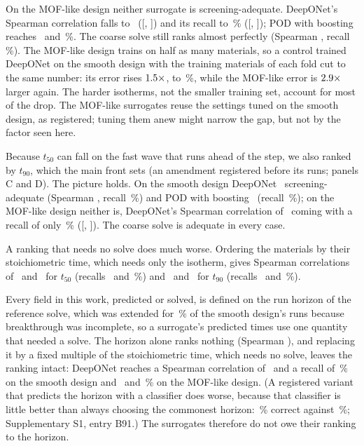 \documentclass[10pt,a4paper]{article}
\begin{document}
On the MOF-like design neither surrogate is screening-adequate. DeepONet's Spearman
correlation falls to \nScrVthreeDonSp\ ([\nScrVthreeDonSpLo, \nScrVthreeDonSpHi]) and its
recall to \nScrVthreeDonRc\,\% ([\nScrVthreeDonRcLo, \nScrVthreeDonRcHi]); POD with boosting
reaches \nScrVthreeHgbSp\ and \nScrVthreeHgbRc\,\%. The coarse solve still ranks almost
perfectly (Spearman \nScrVthreeCoSp, recall \nScrVthreeCoRc\,\%). The MOF-like design trains
on half as many materials, so a control trained DeepONet on the smooth design with the
training materials of each fold cut to the same number: its error rises
\(1.5\times\), to \nCtlNr\,\%, while the MOF-like error is \(2.9\times\)
larger again. The harder isotherms, not the smaller training set, account for most of the
drop. The MOF-like surrogates reuse the settings tuned on the smooth design, as registered;
tuning them anew might narrow the gap, but not by the factor seen here.

Because \(t_{50}\) can fall on the fast wave that runs ahead of the step, we also ranked by
\(t_{90}\), which the main front sets (an amendment registered before its runs; panels C and
D). The picture holds. On the smooth design DeepONet \nSnVtwoNinetyDonOk\ screening-adequate
(Spearman \nSnVtwoNinetyDonSp, recall \nSnVtwoNinetyDonRc\,\%) and POD with boosting
\nSnVtwoNinetyHgbOk\ (recall \nSnVtwoNinetyHgbRc\,\%); on the MOF-like design neither is,
DeepONet's Spearman correlation of \nSnVthreeNinetyDonSp\ coming with a recall of only
\nSnVthreeNinetyDonRc\,\% ([\nSnVthreeNinetyDonRcLo, \nSnVthreeNinetyDonRcHi]). The coarse solve
is adequate in every case.

A ranking that needs no solve does much worse. Ordering the materials by their
stoichiometric time, which needs only the isotherm, gives Spearman correlations of
\nBaseVtwoSp\ and \nBaseVthreeSp\ for \(t_{50}\) (recalls \nBaseVtwoRc\ and \nBaseVthreeRc\,\%)
and \nSnBaseVtwoNinetySp\ and \nSnBaseVthreeNinetySp\ for \(t_{90}\) (recalls
\nSnBaseVtwoNinetyRc\ and \nSnBaseVthreeNinetyRc\,\%).

Every field in this work, predicted or solved, is defined on the run horizon of the
reference solve, which was extended for \nExtVtwoPct\,\% of the smooth design's runs because
breakthrough was incomplete, so a surrogate's predicted times use one quantity that needed a
solve. The horizon alone ranks nothing (Spearman \nLeakVtwoSp), and replacing it by a fixed
multiple of the stoichiometric time, which needs no solve, leaves the ranking intact:
DeepONet reaches a Spearman correlation of \nLeakFixedVtwoSp\ and a recall of
\nLeakFixedVtwoRc\,\% on the smooth design and \nLeakFixedVthreeSp\ and
\nLeakFixedVthreeRc\,\% on the MOF-like design. (A registered variant that predicts the
horizon with a classifier does worse, because that classifier is little better than always
choosing the commonest horizon: \nLeakVtwoMultAcc\,\% correct against \nLeakVtwoMajAcc\,\%;
Supplementary S1, entry B91.) The surrogates therefore do not owe their ranking to the
horizon.
\end{document}
